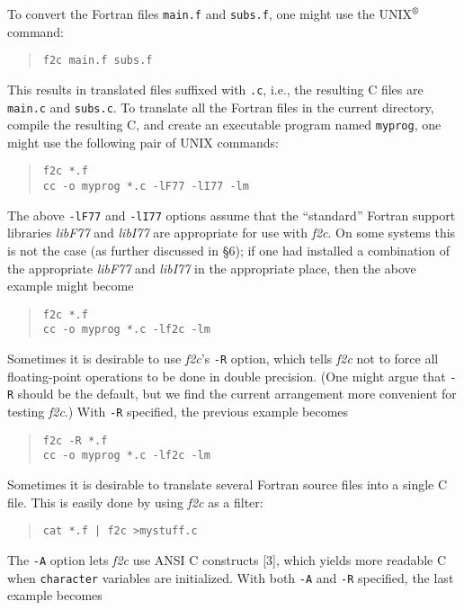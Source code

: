 \documentclass[12pt]{article}
\begin{document}
To convert the Fortran files \verb|main.f| and \verb|subs.f|, one might use the UNIX$^{\text{\textregistered}}$ command:
\begin{quote}
\begin{verbatim}
f2c main.f subs.f
\end{verbatim}
\end{quote}
This results in translated files suffixed with \verb|.c|, i.e., the resulting C files are \verb|main.c| and \verb|subs.c|. To translate all the Fortran files in the current directory, compile the resulting C, and create an executable program named \verb|myprog|, one might use the following pair of UNIX commands:
\begin{quote}
\begin{verbatim}
f2c *.f
cc -o myprog *.c -lF77 -lI77 -lm
\end{verbatim}
\end{quote}
The above \verb|-lF77| and \verb|-lI77| options assume that the ``standard'' Fortran support libraries \emph{libF77} and \emph{libI77} are appropriate for use with \emph{f2c}. On some systems this is not the case (as further discussed in §6); if one had installed a combination of the appropriate \emph{libF77} and \emph{libI77} in the appropriate place, then the above example might become
\begin{quote}
\begin{verbatim}
f2c *.f
cc -o myprog *.c -lf2c -lm
\end{verbatim}
\end{quote}
Sometimes it is desirable to use \emph{f2c}’s \verb|-R| option, which tells \emph{f2c} not to force all floating-point operations to be done in double precision. (One might argue that \verb|-R| should be the default, but we find the current arrangement more convenient for testing \emph{f2c}.) With \verb|-R| specified, the previous example becomes
\begin{quote}
\begin{verbatim}
f2c -R *.f
cc -o myprog *.c -lf2c -lm
\end{verbatim}
\end{quote}
Sometimes it is desirable to translate several Fortran source files into a single C file. This is easily done by using \emph{f2c} as a filter:
\begin{quote}
\begin{verbatim}
cat *.f | f2c >mystuff.c
\end{verbatim}
\end{quote}
The \verb|-A| option lets \emph{f2c} use ANSI C constructs [3], which yields more readable C when \verb|character| variables are initialized. With both \verb|-A| and \verb|-R| specified, the last example becomes
\end{document}
